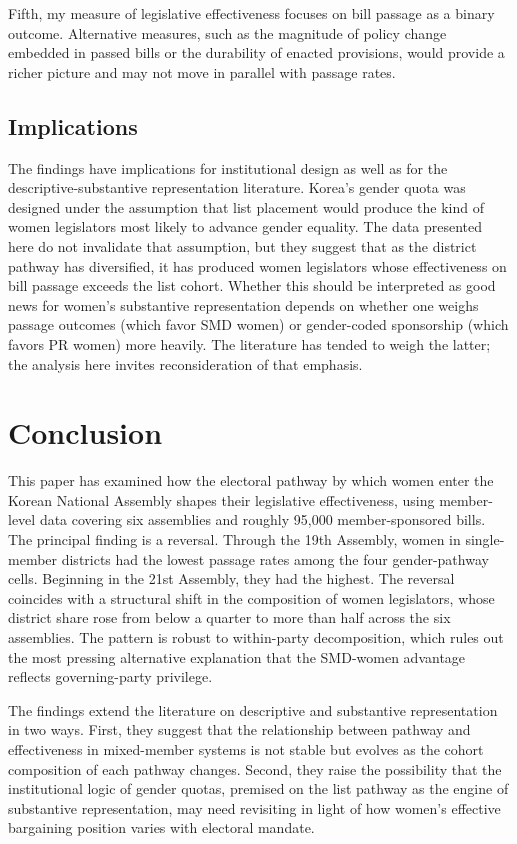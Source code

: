 \documentclass[11pt]{article}
\begin{document}
Fifth, my measure of legislative effectiveness focuses on bill passage as a binary outcome. Alternative measures, such as the magnitude of policy change embedded in passed bills or the durability of enacted provisions, would provide a richer picture and may not move in parallel with passage rates.

\subsection{Implications}

The findings have implications for institutional design as well as for the descriptive-substantive representation literature. Korea's gender quota was designed under the assumption that list placement would produce the kind of women legislators most likely to advance gender equality. The data presented here do not invalidate that assumption, but they suggest that as the district pathway has diversified, it has produced women legislators whose effectiveness on bill passage exceeds the list cohort. Whether this should be interpreted as good news for women's substantive representation depends on whether one weighs passage outcomes (which favor SMD women) or gender-coded sponsorship (which favors PR women) more heavily. The literature has tended to weigh the latter; the analysis here invites reconsideration of that emphasis.

\section{Conclusion}

This paper has examined how the electoral pathway by which women enter the Korean National Assembly shapes their legislative effectiveness, using member-level data covering six assemblies and roughly 95,000 member-sponsored bills. The principal finding is a reversal. Through the 19th Assembly, women in single-member districts had the lowest passage rates among the four gender-pathway cells. Beginning in the 21st Assembly, they had the highest. The reversal coincides with a structural shift in the composition of women legislators, whose district share rose from below a quarter to more than half across the six assemblies. The pattern is robust to within-party decomposition, which rules out the most pressing alternative explanation that the SMD-women advantage reflects governing-party privilege.

The findings extend the literature on descriptive and substantive representation in two ways. First, they suggest that the relationship between pathway and effectiveness in mixed-member systems is not stable but evolves as the cohort composition of each pathway changes. Second, they raise the possibility that the institutional logic of gender quotas, premised on the list pathway as the engine of substantive representation, may need revisiting in light of how women's effective bargaining position varies with electoral mandate.
\end{document}
